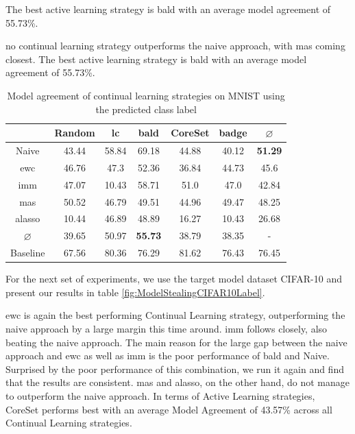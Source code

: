 The best active learning strategy is \gls{bald} with an average model agreement
of 55.73\%. \par

no continual learning strategy outperforms
the naive approach, with \gls{mas} coming closest. The best active learning strategy is \gls{bald} with an average model agreement of 55.73\%. \par 

\begin{table}[h]
    \centering
    \begin{tabular}{c | c c c c c | c } 
         & Random & \gls{lc} & \gls{bald} & CoreSet & \gls{badge} & $\varnothing$ \\ 
        \hline
        Naive & 43.44 & 58.84 & 69.18 & 44.88 & 40.12 & \textbf{51.29}\\
        \gls{ewc} &  46.76 & 47.3 & 52.36 & 36.84 & 44.73 & 45.6\\
        \gls{imm} & 47.07 & 10.43 & 58.71 & 51.0 & 47.0 & 42.84\\
        \gls{mas} & 50.52 & 46.79 & 49.51 & 44.96 & 49.47 & 48.25\\
        \gls{alasso} &  10.44 & 46.89 & 48.89 & 16.27 & 10.43 & 26.68\\
        \hline
        $\varnothing$ & 39.65 & 50.97 & \textbf{55.73} & 38.79 & 38.35 & -\\
        Baseline & 67.56 & 80.36 & 76.29 & 81.62 & 76.43 & 76.45\\
    \end{tabular}
    \caption{Model agreement of continual learning strategies on MNIST using the predicted class label}
    \label{fig:ModelStealingMNISTLabel}
\end{table}


For the next set of experiments, we use the target model dataset CIFAR-10 and present our results in table \ref{fig:ModelStealingCIFAR10Label}. 


\gls{ewc} is again the best performing Continual Learning strategy, outperforming the naive
approach by a large margin this time around. \gls{imm} follows closely, also beating the naive approach. The main reason for the large gap between the naive approach
and \gls{ewc} as well as \gls{imm} is the poor performance of \gls{bald} and Naive. Surprised by the poor performance of this combination, we run it again and find
that the results are consistent. \gls{mas} and \gls{alasso}, on the other hand, do not manage to outperform the naive approach. In terms of Active Learning strategies,
CoreSet performs best with an average Model Agreement of 43.57\% across all Continual Learning strategies. \par

